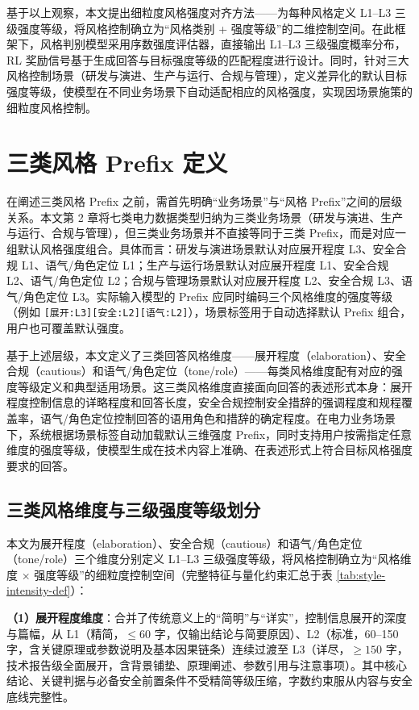 \documentclass[fontset=fandol,type=master,campus=shenzhen,etitleauto=true]{hithesisbook}
\begin{document}
基于以上观察，本文提出细粒度风格强度对齐方法------为每种风格定义 L1--L3 三级强度等级，将风格控制确立为``风格类别 + 强度等级''的二维控制空间。在此框架下，风格判别模型采用序数强度评估器，直接输出 L1--L3 三级强度概率分布，RL 奖励信号基于生成回答与目标强度等级的匹配程度进行设计。同时，针对三大风格控制场景（研发与演进、生产与运行、合规与管理），定义差异化的默认目标强度等级，使模型在不同业务场景下自动适配相应的风格强度，实现因场景施策的细粒度风格控制。

\section{三类风格 Prefix 定义}\label{ux4e09ux7c7bux98ceux683c-prefix-ux5b9aux4e49}

在阐述三类风格 Prefix 之前，需首先明确“业务场景”与“风格 Prefix”之间的层级关系。本文第 2 章将七类电力数据类型归纳为三类业务场景（研发与演进、生产与运行、合规与管理），但三类业务场景并不直接等同于三类 Prefix，而是对应一组默认风格强度组合。具体而言：研发与演进场景默认对应展开程度 L3、安全合规 L1、语气/角色定位 L1；生产与运行场景默认对应展开程度 L1、安全合规 L2、语气/角色定位 L2；合规与管理场景默认对应展开程度 L2、安全合规 L3、语气/角色定位 L3。实际输入模型的 Prefix 应同时编码三个风格维度的强度等级（例如 \texttt{[展开:L3][安全:L2][语气:L2]}），场景标签用于自动选择默认 Prefix 组合，用户也可覆盖默认强度。

基于上述层级，本文定义了三类回答风格维度------展开程度（elaboration）、安全合规（cautious）和语气/角色定位（tone/role）------每类风格维度配有对应的强度等级定义和典型适用场景。这三类风格维度直接面向回答的表述形式本身：展开程度控制信息的详略程度和回答长度，安全合规控制安全措辞的强调程度和规程覆盖率，语气/角色定位控制回答的语用角色和措辞的确定程度。在电力业务场景下，系统根据场景标签自动加载默认三维强度 Prefix，同时支持用户按需指定任意维度的强度等级，使模型生成在技术内容上准确、在表述形式上符合目标风格强度要求的回答。

\subsection{三类风格维度与三级强度等级划分}\label{ux98ceux683cux5f3aux5ea6ux7b49ux7ea7ux5212ux5206}

本文为展开程度（elaboration）、安全合规（cautious）和语气/角色定位（tone/role）三个维度分别定义 L1--L3 三级强度等级，将风格控制确立为``风格维度 × 强度等级''的细粒度控制空间（完整特征与量化约束汇总于表 \ref{tab:style-intensity-def}）：

\textbf{（1）展开程度维度}：合并了传统意义上的``简明''与``详实''，控制信息展开的深度与篇幅，从 L1（精简，$\leq 60$ 字，仅输出结论与简要原因）、L2（标准，60--150 字，含关键原理或参数说明及基本因果链条）连续过渡至 L3（详尽，$\geq 150$ 字，技术报告级全面展开，含背景铺垫、原理阐述、参数引用与注意事项）。其中核心结论、关键判据与必备安全前置条件不受精简等级压缩，字数约束服从内容与安全底线完整性。
\end{document}
